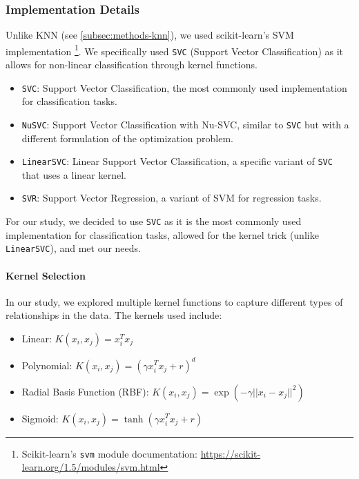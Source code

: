 \subsubsection{Implementation Details}

Unlike KNN (see \autoref{subsec:methods-knn}), we used scikit-learn's SVM implementation
\footnote{Scikit-learn's \texttt{svm} module documentation: \url{https://scikit-learn.org/1.5/modules/svm.html}}.
We specifically used \texttt{SVC} (Support Vector Classification) as it allows for non-linear classification through kernel functions.

\begin{itemize}
    \item \texttt{SVC}: Support Vector Classification, the most commonly used implementation for classification tasks.
    \item \texttt{NuSVC}: Support Vector Classification with Nu-SVC, similar to \texttt{SVC} but with a different formulation of the optimization problem.
    \item \texttt{LinearSVC}: Linear Support Vector Classification, a specific variant of \texttt{SVC} that uses a linear kernel.
    \item \texttt{SVR}: Support Vector Regression, a variant of SVM for regression tasks.
\end{itemize}

For our study, we decided to use \texttt{SVC} as it is the most commonly used implementation
for classification tasks, allowed for the kernel trick (unlike \texttt{LinearSVC}), and met our needs.

\paragraph{Kernel Selection}

In our study, we explored multiple kernel functions to capture different types of relationships in the data. The kernels used include:

\begin{itemize}
    \item Linear: $K(x_i, x_j) = x_i^T x_j$
    \item Polynomial: $K(x_i, x_j) = (\gamma x_i^T x_j + r)^d$
    \item Radial Basis Function (RBF): $K(x_i, x_j) = \exp(-\gamma ||x_i - x_j||^2)$
    \item Sigmoid: $K(x_i, x_j) = \tanh(\gamma x_i^T x_j + r)$
\end{itemize}

